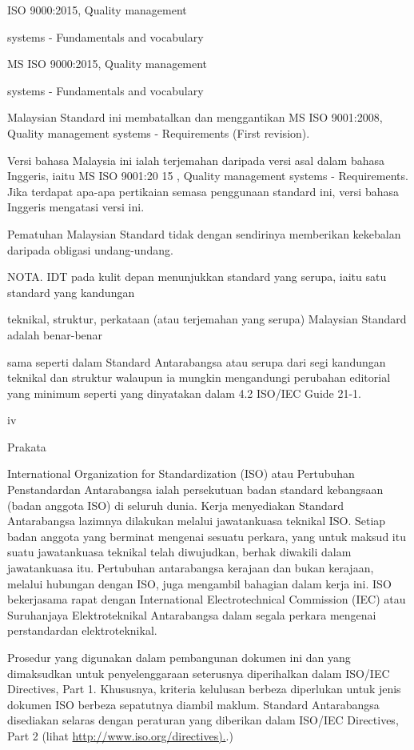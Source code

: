 \documentclass[
]{article}
\begin{document}
ISO 9000:2015, Quality management

systems - Fundamentals and vocabulary

MS ISO 9000:2015, Quality management

systems - Fundamentals and vocabulary

Malaysian Standard ini membatalkan dan menggantikan MS ISO 9001:2008,
Quality management systems - Requirements (First revision).

Versi bahasa Malaysia ini ialah terjemahan daripada versi asal dalam
bahasa Inggeris, iaitu MS ISO 9001:20 15 , Quality management systems -
Requirements. Jika terdapat apa-apa pertikaian semasa penggunaan
standard ini, versi bahasa Inggeris mengatasi versi ini.

Pematuhan Malaysian Standard tidak dengan sendirinya memberikan
kekebalan daripada obligasi undang-undang.

NOTA. IDT pada kulit depan menunjukkan standard yang serupa, iaitu satu
standard yang kandungan

teknikal, struktur, perkataan (atau terjemahan yang serupa) Malaysian
Standard adalah benar-benar

sama seperti dalam Standard Antarabangsa atau serupa dari segi kandungan
teknikal dan struktur walaupun ia mungkin mengandungi perubahan
editorial yang minimum seperti yang dinyatakan dalam 4.2 ISO/IEC Guide
21-1.

iv

Prakata

International Organization for Standardization (ISO) atau Pertubuhan
Penstandardan Antarabangsa ialah persekutuan badan standard kebangsaan
(badan anggota ISO) di seluruh dunia. Kerja menyediakan Standard
Antarabangsa lazimnya dilakukan melalui jawatankuasa teknikal ISO.
Setiap badan anggota yang berminat mengenai sesuatu perkara, yang untuk
maksud itu suatu jawatankuasa teknikal telah diwujudkan, berhak diwakili
dalam jawatankuasa itu. Pertubuhan antarabangsa kerajaan dan bukan
kerajaan, melalui hubungan dengan ISO, juga mengambil bahagian dalam
kerja ini. ISO bekerjasama rapat dengan International Electrotechnical
Commission (IEC) atau Suruhanjaya Elektroteknikal Antarabangsa dalam
segala perkara mengenai perstandardan elektroteknikal.

Prosedur yang digunakan dalam pembangunan dokumen ini dan yang
dimaksudkan untuk penyelenggaraan seterusnya diperihalkan dalam ISO/IEC
Directives, Part 1. Khususnya, kriteria kelulusan berbeza diperlukan
untuk jenis dokumen ISO berbeza sepatutnya diambil maklum. Standard
Antarabangsa disediakan selaras dengan peraturan yang diberikan dalam
ISO/IEC Directives, Part 2 (lihat
\href{http://www.iso.org/directives}{http://www.iso.org/directives).}.)
\end{document}
